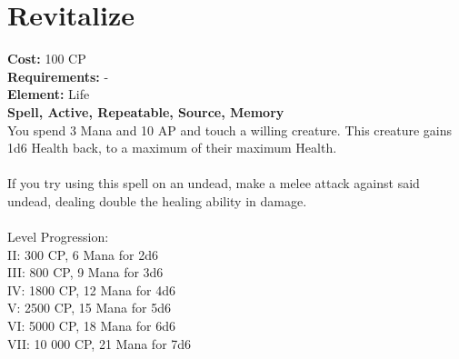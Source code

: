 \section{Revitalize}
\textbf{Cost:} 100 CP\\
\textbf{Requirements:} -\\
\textbf{Element:} Life\\
\textbf{Spell, Active, Repeatable, Source, Memory}\\
You spend 3 Mana and 10 AP and touch a willing creature. This creature gains 1d6 Health back, to a maximum of their maximum Health.\\
\\
If you try using this spell on an undead, make a melee attack against said undead, dealing double the healing ability in damage.\\
\\
Level Progression:\\
II: 300 CP, 6 Mana for 2d6\\
III: 800 CP, 9 Mana for 3d6\\
IV: 1800 CP, 12 Mana for 4d6\\
V: 2500 CP, 15 Mana for 5d6\\
VI: 5000 CP, 18 Mana for 6d6\\
VII: 10 000 CP, 21 Mana for 7d6\\